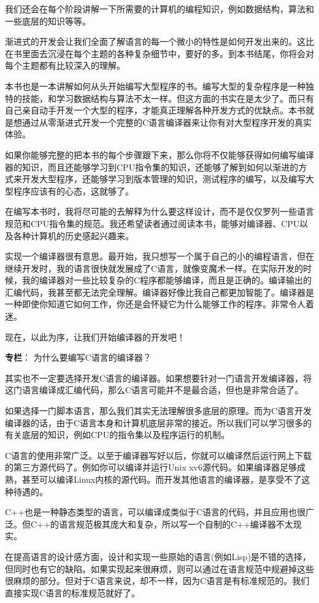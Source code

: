 \documentclass[cn,10pt,math=newtx,citestyle=gb7714-2015,bibstyle=gb7714-2015]{elegantbook}
\begin{document}
我们还会在每个阶段讲解一下所需要的计算机的编程知识，例如数据结构，算法和一些底层的知识等等。

渐进式的开发会让我们全面了解语言的每一个微小的特性是如何开发出来的。这比在书里面去沉浸在每个主题的各种复杂细节中，要好的多。到本书结尾，你将会对每个主题都有比较深入的理解。

本书也是一本讲解如何从头开始编写大型程序的书。编写大型的复杂程序是一种独特的技能，和学习数据结构与算法不太一样。但这方面的书实在是太少了。而只有自己亲自动手开发一个大型的程序，才能真正理解各种开发方式的优缺点。本书就是想通过从零渐进式开发一个完整的C语言编译器来让你有对大型程序开发的真实体验。

如果你能够完整的把本书的每个步骤跟下来，那么你将不仅能够获得如何编写编译器的知识，而且还能够学习到CPU指令集的知识，还能够了解到如何以渐进的方式来开发大型程序，还能够学习到版本管理的知识，测试程序的编写，以及编写大型程序应该有的心态，这就够了。

在编写本书时，我将尽可能的去解释为什么要这样设计，而不是仅仅罗列一些语言规范和CPU指令集的规范。我还希望读者通过阅读本书，能够对编译器、CPU以及各种计算机的历史感起兴趣来。

实现一个编译器很有意思。最开始，我只想写一个属于自己的小的编程语言，但在继续开发时，我的语言很快就发展成了C语言，就像变魔术一样。在实际开发的时候，我的编译器对一些比较复杂的C程序都能够编译，而且是正确的。编译输出的汇编代码，我甚至都无法完全理解。编译器好像比我自己都更加智能了。编译器是一种即使你知道它如何工作，你还是会怀疑它为什么能够工作的程序。非常令人着迷。

现在，以此为序，让我们开始编译器的开发吧！

\begin{tcolorbox}
\textbf{专栏}： 为什么要编写C语言的编译器？

其实也不一定要选择开发C语言的编译器。如果想要针对一门语言开发编译器，将这门语言编译成汇编代码，那么C语言可能并不是最合适，但也是非常合适了。

如果选择一门脚本语言，那么我们其实无法理解很多底层的原理。而为C语言开发编译器的话，由于C语言本身和计算机底层非常的接近。所以我们可以学习很多的有关底层的知识，例如CPU的指令集以及程序运行的机制。

C语言的使用非常广泛。以至于编译器写好以后，你就可以编译然后运行网上下载的第三方源代码了。例如你可以编译并运行Unix xv6源代码。如果编译器足够成熟，甚至可以编译Linux内核的源代码。而开发其他语言的编译器，是享受不了这种待遇的。

C++也是一种静态类型的语言，可以编译成类似于C语言的代码，并且应用也很广泛。但C++的语言规范极其庞大和复杂，所以写一个自制的C++编译器不太现实。

在提高语言的设计感方面，设计和实现一些原始的语言(例如Lisp)是不错的选择，但同时也有它的缺陷。如果实现起来很麻烦，则可以通过在语言规范中规避掉这些很麻烦的部分。但对于C语言来说，却不一样，因为C语言是有标准规范的。我们直接实现C语言的标准规范就好了。

\end{tcolorbox}
\end{document}
